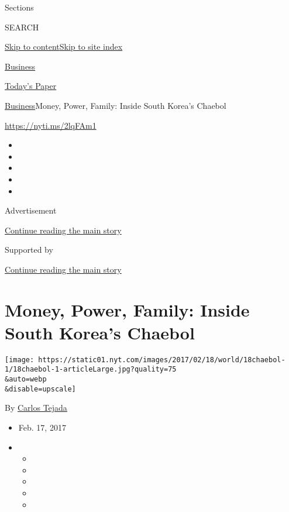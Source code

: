 Sections

SEARCH

\protect\hyperlink{site-content}{Skip to
content}\protect\hyperlink{site-index}{Skip to site index}

\href{https://www.nytimes.com/section/business}{Business}

\href{https://myaccount.nytimes.com/auth/login?response_type=cookie\&client_id=vi}{}

\href{https://www.nytimes.com/section/todayspaper}{Today's Paper}

\href{/section/business}{Business}\textbar{}Money, Power, Family: Inside
South Korea's Chaebol

\url{https://nyti.ms/2lqFAm1}

\begin{itemize}
\item
\item
\item
\item
\item
\end{itemize}

Advertisement

\protect\hyperlink{after-top}{Continue reading the main story}

Supported by

\protect\hyperlink{after-sponsor}{Continue reading the main story}

\hypertarget{money-power-family-inside-south-koreas-chaebol}{%
\section{Money, Power, Family: Inside South Korea's
Chaebol}\label{money-power-family-inside-south-koreas-chaebol}}

\texttt{[image: https://static01.nyt.com/images/2017/02/18/world/18chaebol-1/18chaebol-1-articleLarge.jpg?quality=75\\\&auto=webp\\\&disable=upscale]}

By \href{https://www.nytimes.com/by/carlos-tejada}{Carlos Tejada}

\begin{itemize}
\item
  Feb. 17, 2017
\item
  \begin{itemize}
  \item
  \item
  \item
  \item
  \item
  \end{itemize}
\end{itemize}

